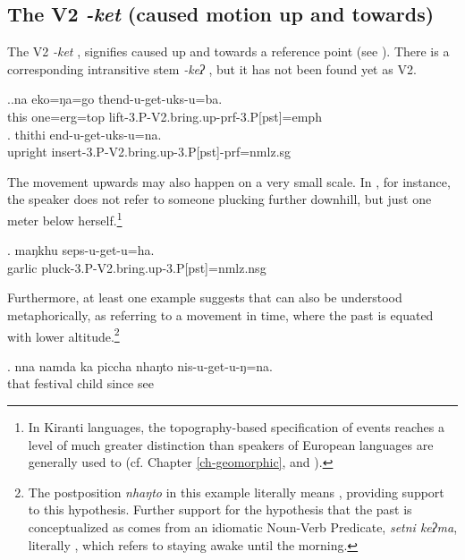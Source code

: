 \subsection{The V2 \emph{-ket} (caused motion up and towards)}\label{V2-bringup}%

The V2 \emph{-ket}  , signifies caused  up and towards a reference point (see \Next). There is a corresponding intransitive stem \emph{-keʔ} , but it has not been found yet as V2.  

\ex.\ag.na   eko=ŋa=go  thend-u-get-uks-u=ba.\\
this one{\sc =erg=top} lift{\sc -3.P-V2.bring.up-prf-3.P[pst]=emph}\\
 
\bg. thithi end-u-get-uks-u=na.\\
upright insert{\sc -3.P-V2.bring.up-3.P[pst]-prf=nmlz.sg}\\


The movement upwards may also happen on a very small scale. In \Next, for instance, the speaker does not refer to someone plucking further downhill, but just one meter below herself.\footnote{In Kiranti languages, the topography-based specification of events reaches a level of much greater distinction than speakers of European languages  are generally used to (cf. Chapter \ref{ch-geomorphic}, and  \citealt{Bickel1999Cultural, Bickel2001Deictic, Ebert1999The-up---down, Gaenszle1999Travelling}).}

\exg. maŋkhu seps-u-get-u=ha.\\
garlic pluck{\sc -3.P-V2.bring.up-3.P[pst]=nmlz.nsg}\\

Furthermore, at least one example suggests that  can also be understood metaphorically, as referring to a movement in time, where the past is equated with lower altitude.\footnote{The postposition \emph{nhaŋto}  in this example literally means , providing  support to this hypothesis. Further support for the hypothesis that the past is conceptualized as  comes from an idiomatic Noun-Verb Predicate, \emph{setni keʔma}, literally , which refers to staying awake until the morning.}

\exg. nna  namda ka       piccha nhaŋto nis-u-get-u-ŋ=na.\\
that festival  child since see\\
  


